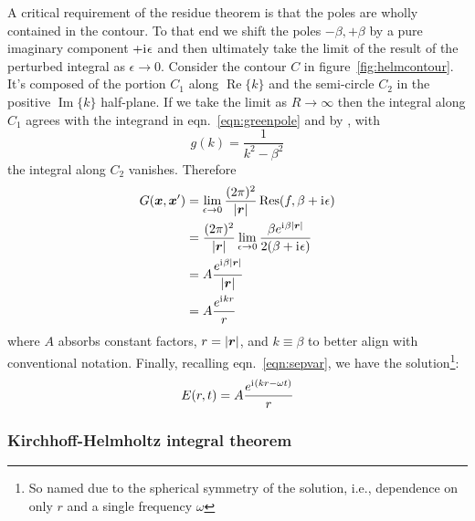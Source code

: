 A critical requirement of the residue theorem is that the poles are wholly contained in the contour.
%
To that end we shift the poles \(-\beta,+\beta\) by a pure imaginary component \(+\mathrm{i}\mkern1mu \epsilon\) and then ultimately take the limit of the result of the perturbed integral as \(\epsilon \rightarrow 0\).
%
Consider the contour \(C\) in figure~\ref{fig:helmcontour}.
%
It's composed of the portion \(C_1\) along \(\operatorname{Re} \{k\}\) and the semi-circle \(C_2\) in the positive \(\operatorname{Im} \{k\}\) half-plane.
%
If we take the limit as \(R \rightarrow \infty\) then the integral along \(C_1\) agrees with the integrand in eqn.~\eqref{eqn:greenpole} and by , with 
%
\[
    g(k)=\frac{1}{k^2 - \beta^2}
\]
%
the integral along \(C_2\) vanishes.
%
Therefore
%
\begin{align}
    G(\bm{x}, \bm{x}') & = \lim_{\epsilon \rightarrow 0}  \frac{(2\pi)^2}{\abs{\bm{r}}} \operatorname {Res} (f, \beta+\mathrm{i}\mkern1mu \epsilon)                       \\
                 & = \frac{(2\pi)^2}{\abs{\bm{r}}} \lim_{\epsilon \rightarrow 0} \frac{\beta e^{\mathrm{i}\mkern1mu \beta \abs{\bm{r}}}}{ 2(\beta + \mathrm{i}\mkern1mu \epsilon) } \\
                 & = A \frac{e^{\mathrm{i}\mkern1mu \beta \abs{\bm{r}}}}{\abs{\bm{r}} } \\ 
                 & = A \frac{e^{\mathrm{i}\mkern1mu k r}}{r} \label{eqn:helmholtzsoln}
\end{align}
%
where \(A\) absorbs constant factors, \(r = \abs{\bm{r}}\), and \(k \equiv \beta\) to better align with conventional notation.
%
%
Finally, recalling eqn.~\eqref{eqn:sepvar}, we have the  solution\footnote{So named due to the spherical symmetry of the solution, i.e., dependence on only \(r\) and a single frequency \(\omega\)}:
%
\begin{equation}
    E(r, t) = A\frac{e^{\mathrm{i}\mkern1mu (k r - \omega t)}}{r}\label{eqn:sphericalwavesoln}
\end{equation}
%

\subsubsection{Kirchhoff-Helmholtz integral theorem}

